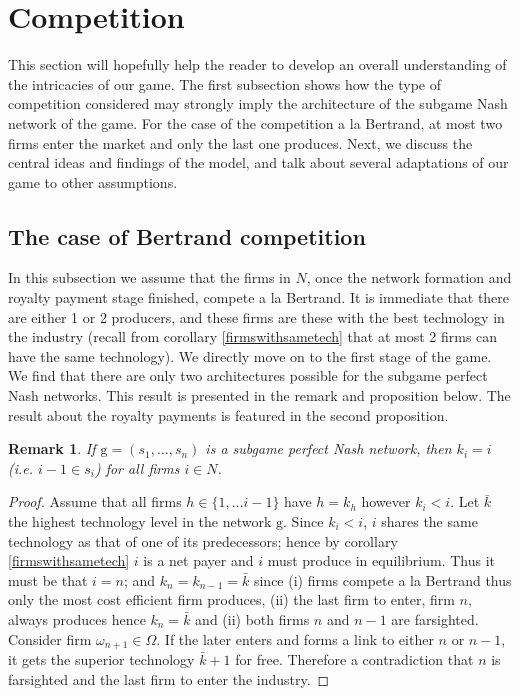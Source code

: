\documentclass{article}
\newtheorem{remark}{Remark}
\begin{document}
\section{Competition}
This section will hopefully help the reader to develop an overall understanding of the intricacies of our game. The first subsection shows how the type of competition considered may strongly imply the architecture of the subgame Nash network of the game. For the case of the competition a la Bertrand, at most two firms enter the market and only the last one produces. Next, we discuss the central ideas and findings of the model, and talk about several adaptations of our game to other assumptions. 
    
\subsection{The case of Bertrand competition}
In this subsection we assume that the firms in $N$, once the network formation and royalty payment stage finished, compete a la Bertrand. It is immediate that there are either 1 or 2 producers, and these firms are these with the best technology in the industry (recall from corollary \ref{firmswithsametech} that at most 2 firms can have the same technology). We directly move on to the first stage of the game. We find that there are only two architectures possible for the subgame perfect Nash networks. This result is presented in the remark and proposition below. The result about the royalty payments is featured in the second proposition. \\

\begin{remark}\label{bertrand is a chain}
If $\text{g}=(s_1,\ldots, s_n)$ is a subgame perfect Nash network, then $k_i=i$ (i.e. $i-1\in s_i$) for all firms $i\in N$.
\end{remark} 
\begin{proof}
Assume that all firms $h\in \{1,\ldots i-1\}$ have $h=k_h$ however $k_i<i$. Let $\bar{k}$ the highest technology level in the network $\text{g}$. Since $k_i<i$, $i$ shares the same technology as that of one of its predecessors; hence by corollary \ref{firmswithsametech} $i$ is a net payer and $i$ must produce in equilibrium. Thus it must be that $i=n$; and $k_n=k_{n-1}=\bar{k}$ since (i) firms compete a la Bertrand thus only the most cost efficient firm produces, (ii) the last firm to enter, firm $n$, always produces hence $k_n=\bar{k}$ and (ii) both firms $n$ and $n-1$ are farsighted. Consider firm $\omega_{n+1}\in \Omega$. If the later enters and forms a link to either $n$ or $n-1$, it gets the superior technology $\bar{k}+1$ for free. Therefore a contradiction that $n$ is farsighted and the last firm to enter the industry.    
\end{proof}
\end{document}
